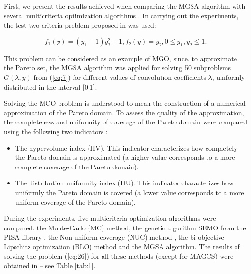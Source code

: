 \documentclass[review]{elsarticle}
\begin{document}
First, we present the results achieved when comparing the MGSA algorithm with several multicriteria optimization algorithms \cite{c37}. In carrying out the experiments, the test two-criteria problem proposed in \cite{c38} was used:

\begin{equation}\label{eq:26}
f_1(y)=(y_1-1) y_2^2+1,f_2 (y)=y_2, 0 \leq y_1, y_2 \leq 1.
\end{equation}

This problem can be considered as an example of MGO, since, to approximate the Pareto set, the MGSA algorithm was applied for solving 50 subproblems $G (\lambda, y)$ from (\ref{eq:7}) for different values of convolution coefficients $\lambda$, uniformly distributed in the interval [0,1].



Solving the MCO problem is understood to mean the construction of a numerical approximation of the Pareto domain. To assess the quality of the approximation, the completeness and uniformity of coverage of the Pareto domain were compared using the following two indicators  \cite{c28,c37}:
\begin{itemize}
	 \item The hypervolume index (HV). This indicator characterizes how completely the Pareto domain is approximated (a higher value corresponds to a more complete coverage of the Pareto domain). 
	 \item The distribution uniformity index (DU). This indicator characterizes how uniformly the Pareto domain is covered (a lower value corresponds to a more uniform coverage of the Pareto domain).
\end{itemize}

During the experiments, five multicriteria optimization algorithms were compared: the Monte-Carlo (MC) method, the genetic algorithm SEMO from the PISA library \cite{c39}, the Non-uniform coverage (NUC) method \cite{c37}, the bi-objective Lipschitz optimization (BLO) method \cite{c38} and the MGSA algorithm. The results of solving the problem (\ref{eq:26}) for all these methods (except for MAGCS) were obtained in \cite{c38} -- see Table \ref{tab:1}.
\end{document}
